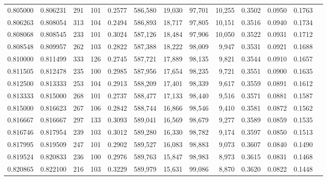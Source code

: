 \begin{tabular}{rrrrrrrrrrrrr}
0.805000 & 0.806231 &    291 &   101 &                                     0.2577 & 586,580 &  19,030 &  97,701 &  10,255 & 0.3502 & 0.0950 & 0.1763 \\
0.806263 & 0.808054 &    313 &   104 &                                     0.2494 & 586,893 &  18,717 &  97,805 &  10,151 & 0.3516 & 0.0940 & 0.1734 \\
0.808068 & 0.808545 &    233 &   101 &                                     0.3024 & 587,126 &  18,484 &  97,906 &  10,050 & 0.3522 & 0.0931 & 0.1712 \\
0.808548 & 0.809957 &    262 &   103 &                                     0.2822 & 587,388 &  18,222 &  98,009 &   9,947 & 0.3531 & 0.0921 & 0.1688 \\
0.810000 & 0.811499 &    333 &   126 &                                     0.2745 & 587,721 &  17,889 &  98,135 &   9,821 & 0.3544 & 0.0910 & 0.1657 \\
0.811505 & 0.812478 &    235 &   100 &                                     0.2985 & 587,956 &  17,654 &  98,235 &   9,721 & 0.3551 & 0.0900 & 0.1635 \\
0.812500 & 0.813333 &    253 &   104 &                                     0.2913 & 588,209 &  17,401 &  98,339 &   9,617 & 0.3559 & 0.0891 & 0.1612 \\
0.813333 & 0.815000 &    268 &   101 &                                     0.2737 & 588,477 &  17,133 &  98,440 &   9,516 & 0.3571 & 0.0881 & 0.1587 \\
0.815000 & 0.816623 &    267 &   106 &                                     0.2842 & 588,744 &  16,866 &  98,546 &   9,410 & 0.3581 & 0.0872 & 0.1562 \\
0.816667 & 0.816667 &    297 &   133 &                                     0.3093 & 589,041 &  16,569 &  98,679 &   9,277 & 0.3589 & 0.0859 & 0.1535 \\
0.816746 & 0.817954 &    239 &   103 &                                     0.3012 & 589,280 &  16,330 &  98,782 &   9,174 & 0.3597 & 0.0850 & 0.1513 \\
0.817995 & 0.819509 &    247 &   101 &                                     0.2902 & 589,527 &  16,083 &  98,883 &   9,073 & 0.3607 & 0.0840 & 0.1490 \\
0.819524 & 0.820833 &    236 &   100 &                                     0.2976 & 589,763 &  15,847 &  98,983 &   8,973 & 0.3615 & 0.0831 & 0.1468 \\
0.820865 & 0.822100 &    216 &   103 &                                     0.3229 & 589,979 &  15,631 &  99,086 &   8,870 & 0.3620 & 0.0822 & 0.1448 \\

\end{tabular}
